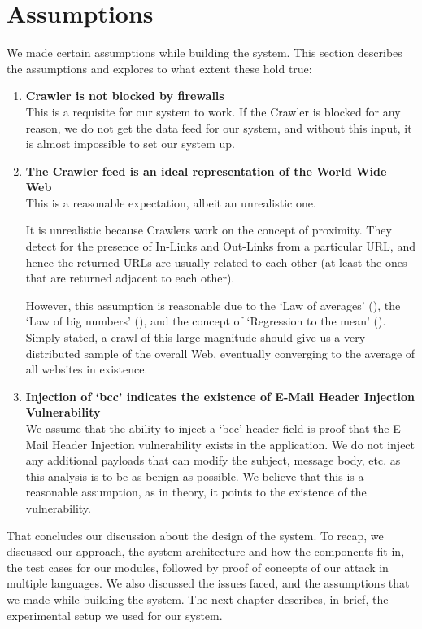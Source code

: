 \section{Assumptions}
We made certain assumptions while building the system. This section describes the assumptions and explores to what extent these hold true:
\begin{enumerate}
	\item \textbf{Crawler is not blocked by firewalls}\\
	This is a requisite for our system to work. If the Crawler is blocked for any reason, we do not get the data feed for our system, and without this input, it is almost impossible to set our system up.
	\item \textbf{The Crawler feed is an ideal representation of the World Wide Web} \\
	This is a reasonable expectation, albeit an unrealistic one.
	
	It is unrealistic because Crawlers work on the concept of proximity. They detect for the presence of In-Links and Out-Links from a particular URL, and hence the returned URLs are usually related to each other (at least the ones that are returned adjacent to each other).
	
	However, this assumption is reasonable due to the `Law of averages' (\cite{wiki:Law_of_averages}), the `Law of big numbers' (\cite{wiki:Law_of_large_numbers}), and the concept of `Regression to the mean' (\cite{wiki:Regression_toward_the_mean}). Simply stated, a crawl of this large magnitude should give us a very distributed sample of the overall Web, eventually converging to the average of all websites in existence.
	
	\item \textbf{Injection of `bcc' indicates the existence of E-Mail Header Injection Vulnerability} \\
	We assume that the ability to inject a `bcc' header field is proof that the E-Mail Header Injection vulnerability exists in the application. We do not inject any additional payloads that can modify the subject, message body, etc. as this analysis is to be as benign as possible.
	We believe that this is a reasonable assumption, as in theory, it points to the existence of the vulnerability.
\end{enumerate}

That concludes our discussion about the design of the system. To recap, we discussed our approach, the system architecture and how the components fit in, the test cases for our modules, followed by proof of concepts of our attack in multiple languages. We also discussed the issues faced, and the assumptions that we made while building the system. The next chapter describes, in brief, the experimental setup we used for our system.